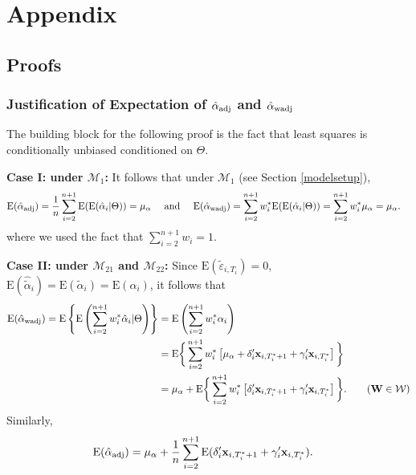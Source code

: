\documentclass[11pt]{article}
\def\mbf#1{\mathbf{#1}} %
\def\mrm#1{\mathrm{#1}} %
\def\mc#1{\mathcal{#1}} %
\def\E#1{\mathrm{E}(#1)} %
\theoremstyle{definition}
\begin{document}
\section{Appendix}

\subsection{Proofs}

\label{proofs}

\subsubsection{Justification of Expectation of $\hat{\alpha}_{\rm adj}$ and $\hat{\alpha}_{\rm wadj}$}
\label{exp}

The building block for the following proof is the fact that least squares is conditionally unbiased conditioned on $\Theta$. 

\noindent \textbf{Case I: under $\mc{M}_{1}$:} It follows that  under $\mc{M}_{1}$ (see Section \ref{modelsetup}),
\begin{align*}
\E{\hat{\alpha}_{\rm adj}} =\frac{1}{n}  \sum_{i=2}^{n+1} \E{\E{\hat{\alpha}_i|\Theta}} = \mu_{\alpha} 
\quad \text{ and } \quad \E{\hat{\alpha}_{\rm wadj}}&= \sum_{i=2}^{n+1} w_i^* \E{\E{\hat{\alpha}_i|\Theta}}= \sum_{i=2}^{n+1} w_i^*\mu_{\alpha}= \mu_{\alpha}.
\end{align*}
where we used the fact that $\sum_{i=2}^{n+1} w_i=1$. 

\noindent \textbf{Case II: under $\mc{M}_{21}$ and $\mc{M}_{22}$:} Since $\E{\tilde{\varepsilon}_{i, T_i}}=0$, $\E{\hat{\tilde{\alpha}}_{i}}=\E{\tilde{\alpha}_{i}}=\E{\alpha_{i}}$, it follows that
  \begin{align*}
   \E{\hat{\alpha}_{\rm wadj}}= \mrm{E}\left\{\mrm{E}\left(\sum_{i=2}^{n+1} w_i^*\hat{\alpha}_i|\Theta\right)\right\}
   &= \mrm{E}\left( \sum_{i=2}^{n+1} w_i^*\alpha_i\right)\\
   &= \mrm{E}\bigg\{ \sum_{i=2}^{n+1} w_i^*\left[\mu_{\alpha}+\delta_{i}'\mbf{x}_{i, T_i^*+1}+\gamma_i'\mbf{x}_{i, T^*_i}\right]\bigg\}\\
   &=\mu_{\alpha}+\mrm{E}\bigg\{ \sum_{i=2}^{n+1} w_i^*\left[\delta_{i}'\mbf{x}_{i, T_i^*+1}+\gamma_i'\mbf{x}_{i, T^*_i}\right]\bigg\}.\tag{$\mbf{W}\in \mc{W}$}
   \end{align*}
Similarly,
  \begin{align*}
   \E{\hat{\alpha}_{\rm adj}}
   &=\mu_{\alpha}+\frac{1}{n}\sum_{i=2}^{n+1} \E{\delta_{i}'\mbf{x}_{i, T_i^*+1}+\gamma_i'\mbf{x}_{i, T^*_i}}.
   \end{align*}
\end{document}
